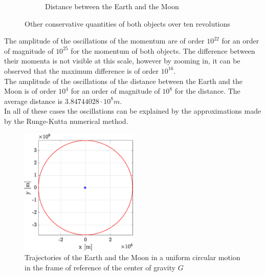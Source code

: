 \documentclass[a4paper,12pt,twoside]{article}
\begin{document}
\begin{figure}[h]
\begin{subfigure}[t]{0.48\textwidth}
    \caption{Distance between the Earth and the Moon}
    \label{fig:4d}
  \end{subfigure}
  \caption{Other conservative quantities of both objects over ten revolutions}
  \label{fig:4cons}
\end{figure}

The amplitude of the oscillations of the momentum are of order $10^{22}$ for an order of magnitude of $10^{25}$ for the momentum of both objects. The difference between their momenta is not visible at this scale, however by zooming in, it can be observed that the maximum difference is of order $10^{16}$.\\
The amplitude of the oscillations of the distance between the Earth and the Moon is of order $10^4$ for an order of magnitude of $10^8$ for the distance. The average distance is $3.84744028 \cdot 10^8 m$.\\
In all of these cases the oscillations can be explained by the approximations made by the Runge-Kutta numerical method.

\begin{figure}[h]
  \centering
  \includegraphics[width=0.5\textwidth]{graphs/ex4_traj.eps}
  \caption{Trajectories of the Earth and the Moon in a uniform circular motion in the frame of reference of the center of gravity $G$}
  \label{fig:4_traj}
\end{figure}
\end{document}
